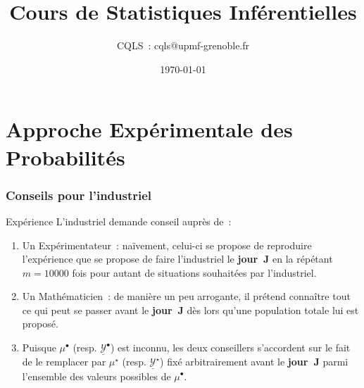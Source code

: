 \documentclass[11pt]{beamer}
\title[Problématiques Produits A et B]
{Cours de Statistiques Inférentielles}
\author{CQLS~: cqls@upmf-grenoble.fr}
\date{\today}
\newcommand{\Sim}{{\star}}
\begin{document}
\maketitle


\section[A.E.P.]{Approche Expérimentale des Probabilités}

\begin{frame}
\frametitle{Conseils pour l'industriel }
\begin{alertblock}{Expérience}
L'industriel demande conseil auprès de~:
\begin{enumerate}[<+-| alert@+>]
\item Un Expérimentateur~: naïvement, celui-ci se propose de reproduire l'expérience que se propose de faire l'industriel le \textbf{jour~J} en la répétant $m=10000$ fois pour autant de situations souhaitées par l'industriel.
\item Un Mathématicien~: de manière un peu arrogante, il prétend connaître tout ce qui peut se passer avant le \textbf{jour~J} dès lors qu'une population totale  lui est proposé.
\item[] Puisque $\mu^\bullet$  (resp. $\underline{\mathcal{Y}}^\bullet$) est inconnu, les deux conseillers s'accordent sur le fait de le remplacer par $\mu^\Sim$ (resp. $\underline{\mathcal{Y}}^\Sim$) fixé arbitrairement avant le \textbf{jour~J} parmi l'ensemble des valeurs possibles de $\mu^\bullet$. 
\end{enumerate}
\end{alertblock}
\end{frame}
\end{document}
